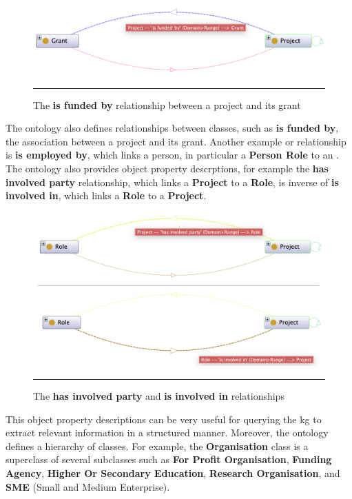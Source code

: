 \begin{figure}[htbp]
    \centering
 \includegraphics[width=\textwidth]{03_Figures/research-methods/is-funded-by.png}
     \rule{35em}{0.5pt}
    \caption{The \textbf{is funded by} relationship between a project and its grant}
 \label{fig:is-funded-by}
\end{figure}

The ontology also defines relationships between classes, such as \textbf{is funded by}, the association between a project and its grant.
Another example or relationship is \textbf{is employed by}, which links a person, in particular a \textbf{Person Role} to an .
The ontology also provides object property descrptions, for example the \textbf{has involved party} relationship, which links a \textbf{Project} to a \textbf{Role}, is inverse of \textbf{is involved in}, which links a \textbf{Role} to a \textbf{Project}.

\begin{figure}[htbp]
    \centering
 \includegraphics[width=\textwidth]{03_Figures/research-methods/has-involved-party-is-involved-in.png}
     \rule{35em}{0.5pt}
    \caption{The \textbf{has involved party} and \textbf{is involved in} relationships}
 \label{fig:is-involved-in-has-involved-party}
\end{figure}

This object property descriptions can be very useful for querying the \gls{kg} to extract relevant information in a structured manner.
Moreover, the ontology defines a hierarchy of classes.
For example, the \textbf{Organisation} class is a superclass of several subclasses such as \textbf{For Profit Organisation}, \textbf{Funding Agency}, \textbf{Higher Or Secondary Education}, \textbf{Research Organisation}, and \textbf{SME} (Small and Medium Enterprise).

